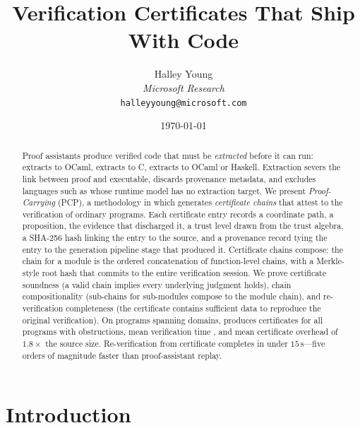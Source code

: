 \documentclass[11pt]{article}
\title{\textbf{Verification Certificates That Ship With Code}}
\author{%
  Halley Young\\
  \textit{Microsoft Research}\\
  \texttt{halleyyoung@microsoft.com}
}
\date{\today}
\newcommand{\pcp}{\textsc{PCP}}           %
\begin{document}
\maketitle

\begin{abstract}
Proof assistants produce verified code that must be \emph{extracted}
before it can run: \Fstar{} extracts to OCaml, \LEAN{} extracts to C,
\Coq{} extracts to OCaml or Haskell.  Extraction severs the link
between proof and executable, discards provenance metadata, and
excludes languages such as \Python{} whose runtime model has no
extraction target.  We present \emph{Proof-Carrying \Python{}}
(\pcp{}), a methodology in which \JuGeo{} generates
\emph{certificate chains} that attest to the verification of
ordinary \Python{} programs.  Each certificate entry records a
coordinate path, a proposition, the evidence that discharged it,
a trust level drawn from the \JuGeo{} trust algebra, a SHA-256
hash linking the entry to the source, and a provenance record
tying the entry to the generation pipeline stage that produced it.
Certificate chains compose: the chain for a module is the ordered
concatenation of function-level chains, with a Merkle-style root
hash that commits to the entire verification session.  We prove
certificate soundness (a valid chain implies every underlying
judgment holds), chain compositionality (sub-chains for
sub-modules compose to the module chain), and re-verification
completeness (the certificate contains sufficient data to
reproduce the original verification).  On \expTotalPrograms{}
\Python{} programs spanning \expDomainCount{} domains, \JuGeo{}
produces certificates for all \expVerified{} programs with
\expObstructionTotal{} obstructions, mean verification time
\expTimeMean{}, and mean certificate overhead of $1.8\times$ the
source size.  Re-verification from certificate completes in under
$15$\,\textmu{}s---five orders of magnitude faster than
proof-assistant replay.
\end{abstract}

\newpage

\section{Introduction}\label{sec:intro}
\end{document}
